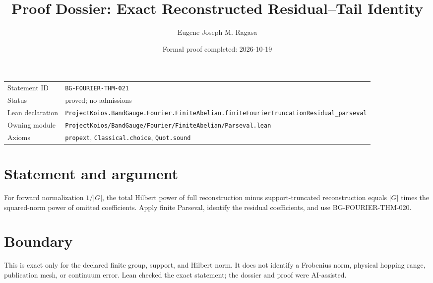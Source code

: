 \documentclass[11pt]{article}
\title{Proof Dossier: Exact Reconstructed Residual--Tail Identity}
\author{Eugene Joseph M. Ragasa}
\date{Formal proof completed: 2026-10-19}
\begin{document}
\maketitle
\noindent\begin{tabularx}{\textwidth}{@{}lX@{}}\toprule
Statement ID & \texttt{BG-FOURIER-THM-021} \\
Status & proved; no admissions \\
Lean declaration & \texttt{ProjectKoios.BandGauge.Fourier.FiniteAbelian.}\newline\texttt{finiteFourierTruncationResidual\_parseval} \\
Owning module & \texttt{ProjectKoios/BandGauge/Fourier/FiniteAbelian/Parseval.lean} \\
Axioms & \texttt{propext}, \texttt{Classical.choice}, \texttt{Quot.sound} \\
\bottomrule\end{tabularx}
\section{Statement and argument}
For forward normalization $1/|G|$, the total Hilbert power of full reconstruction minus support-truncated reconstruction equals $|G|$ times the squared-norm power of omitted coefficients. Apply finite Parseval, identify the residual coefficients, and use BG-FOURIER-THM-020.
\section{Boundary}
This is exact only for the declared finite group, support, and Hilbert norm. It does not identify a Frobenius norm, physical hopping range, publication mesh, or continuum error. Lean checked the exact statement; the dossier and proof were AI-assisted.
\end{document}
